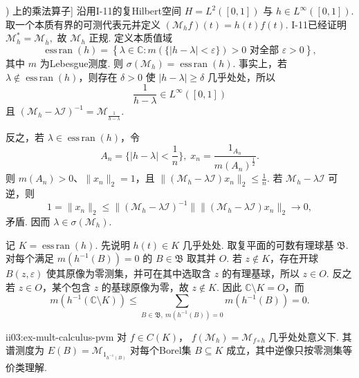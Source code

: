 \begin{FAExample}[\(\displaystyle L^2([0,1])\) 上的乘法算子]\label{ii03:ex-mult}
沿用I-11的复Hilbert空间 \(\displaystyle H=L^2([0,1])\) 与 \(\displaystyle h\in L^\infty([0,1])\). 取一个本质有界的可测代表元并定义
\(\displaystyle (\mathcal M_hf)(t)=h(t)f(t).\)
I-11已经证明
\(\displaystyle \mathcal M_h^*=\mathcal M_{\overline h},\)
故 \(\displaystyle\mathcal M_h\) 正规. 定义本质值域
\[
\operatorname{ess\,ran}(h)
=
\left\{
\lambda\in\mathbb C:
 m(\{|h-\lambda|<\varepsilon\})>0
\text{ 对全部 }\varepsilon>0
\right\},
\]
其中 \(\displaystyle m\) 为Lebesgue测度. 则
\(\displaystyle \sigma(\mathcal M_h)=\operatorname{ess\,ran}(h).\)
事实上，若 \(\displaystyle\lambda\notin\operatorname{ess\,ran}(h)\)，则存在 \(\displaystyle\delta>0\) 使 \(\displaystyle|h-\lambda|\geqslant\delta\) 几乎处处，所以
\[
\frac1{h-\lambda}\in L^\infty([0,1])
\]
且 \(\displaystyle(\mathcal M_h-\lambda\mathcal I)^{-1}=\mathcal M_{\frac{1}{h-\lambda}}\).

反之，若 \(\displaystyle\lambda\in\operatorname{ess\,ran}(h)\)，令
\[
A_n=\{|h-\lambda|<\frac{1}{n}\},
\;
x_n=\frac{1_{A_n}}{m(A_n)^{\frac{1}{2}}}.
\]
则 \(\displaystyle m(A_n)>0\)、\(\displaystyle\|x_n\|_2=1\)，且
\(\displaystyle \|(\mathcal M_h-\lambda\mathcal I)x_n\|_2 \leqslant\frac1n.\)
若 \(\displaystyle\mathcal M_h-\lambda\mathcal I\) 可逆，则
\[
1=\|x_n\|_2
\leqslant\|(\mathcal M_h-\lambda\mathcal I)^{-1}\|\|(\mathcal M_h-\lambda\mathcal I)x_n\|_2
\longrightarrow0,
\]
矛盾. 因而 \(\displaystyle\lambda\in\sigma(\mathcal M_h)\).
\end{FAExample}

记 \(\displaystyle K=\operatorname{ess\,ran}(h)\). 先说明 \(\displaystyle h(t)\in K\) 几乎处处. 取复平面的可数有理球基 \(\displaystyle\mathfrak B\). 对每个满足 \(\displaystyle m(h^{-1}(B))=0\) 的 \(\displaystyle B\in\mathfrak B\) 取其并 \(\displaystyle O\). 若 \(\displaystyle z\notin K\)，存在开球 \(\displaystyle B(z,\varepsilon)\) 使其原像为零测集，并可在其中选取含 \(\displaystyle z\) 的有理基球，所以 \(\displaystyle z\in O\). 反之若 \(\displaystyle z\in O\)，某个包含 \(\displaystyle z\) 的基球原像为零，故 \(\displaystyle z\notin K\). 因此 \(\displaystyle\mathbb C\setminus K=O\)，而
\[
m(h^{-1}(\mathbb C\setminus K))
\leqslant
\sum_{B\in\mathfrak B,\ m(h^{-1}(B))=0}m(h^{-1}(B))
=0.
\]

\begin{FAProposition}[B][乘法算子模型的连续函数演算与显式投影值测度]{ii03:ex-mult-calculus-pvm}
对 \(\displaystyle f\in C(K)\)，
\(\displaystyle f(\mathcal M_h)=\mathcal M_{f\circ h} \;\text{几乎处处意义下}.\)
其谱测度为
\(\displaystyle E(B)=\mathcal M_{1_{h^{-1}(B)}}\)
对每个Borel集 \(\displaystyle B\subseteq K\) 成立，其中逆像只按零测集等价类理解.
\end{FAProposition}

